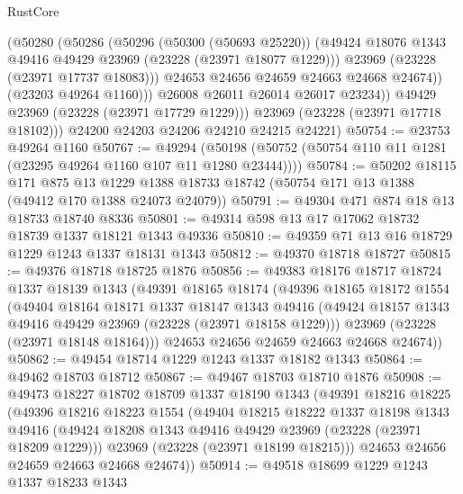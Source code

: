 \begin{lexlean}{RustCore}
\begin{coremodule}
                  (@50280
                    (@50286
                      (@50296
                        (@50300 (@50693 @25220))
                        (@49424 @18076 @1343 @49416 @49429 @23969 (@23228 (@23971 @18077 @1229)))
                        @23969
                        (@23228 (@23971 @17737 @18083)))
                      @24653
                      @24656
                      @24659
                      @24663
                      @24668
                      @24674))
                  (@23203 @49264 @1160)))
              @26008
              @26011
              @26014
              @26017
              @23234))
          @49429
          @23969
          (@23228 (@23971 @17729 @1229)))
        @23969
        (@23228 (@23971 @17718 @18102)))
      @24200
      @24203
      @24206
      @24210
      @24215
      @24221)
@50754 := @23753 @49264 @1160
@50767 := @49294
    (@50198 (@50752 (@50754 @110 @11 @1281 (@23295 @49264 @1160 @107 @11 @1280 @23444))))
@50784 := @50202
    @18115
    @171
    @875
    @13
    @1229
    @1388
    @18733
    @18742
    (@50754 @171 @13 @1388 (@49412 @170 @1388 @24073 @24079))
@50791 := @49304 @471 @874 @18 @13 @18733 @18740 @8336
@50801 := @49314 @598 @13 @17 @17062 @18732 @18739 @1337 @18121 @1343 @49336
@50810 := @49359 @71 @13 @16 @18729 @1229 @1243 @1337 @18131 @1343
@50812 := @49370 @18718 @18727
@50815 := @49376 @18718 @18725 @1876
@50856 := @49383
    @18176
    @18717
    @18724
    @1337
    @18139
    @1343
    (@49391
      @18165
      @18174
      (@49396
        @18165
        @18172
        @1554
        (@49404
          @18164
          @18171
          @1337
          @18147
          @1343
          @49416
          (@49424 @18157 @1343 @49416 @49429 @23969 (@23228 (@23971 @18158 @1229)))
          @23969
          (@23228 (@23971 @18148 @18164)))
        @24653
        @24656
        @24659
        @24663
        @24668
        @24674))
@50862 := @49454 @18714 @1229 @1243 @1337 @18182 @1343
@50864 := @49462 @18703 @18712
@50867 := @49467 @18703 @18710 @1876
@50908 := @49473
    @18227
    @18702
    @18709
    @1337
    @18190
    @1343
    (@49391
      @18216
      @18225
      (@49396
        @18216
        @18223
        @1554
        (@49404
          @18215
          @18222
          @1337
          @18198
          @1343
          @49416
          (@49424 @18208 @1343 @49416 @49429 @23969 (@23228 (@23971 @18209 @1229)))
          @23969
          (@23228 (@23971 @18199 @18215)))
        @24653
        @24656
        @24659
        @24663
        @24668
        @24674))
@50914 := @49518 @18699 @1229 @1243 @1337 @18233 @1343

\end{coremodule}
\end{lexlean}
